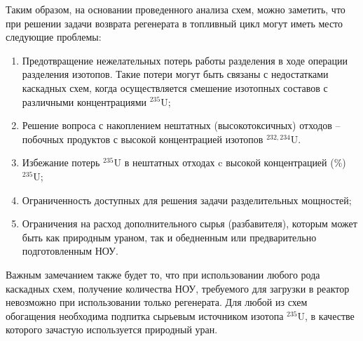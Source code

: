 Таким образом, на основании проведенного анализа схем, можно заметить, что при решении задачи возврата регенерата в топливный цикл могут иметь место следующие проблемы:
\begin{enumerate}
  \item Предотвращение нежелательных потерь работы разделения в ходе операции разделения изотопов. Такие потери могут быть связаны с недостатками каскадных схем, когда осуществляется смешение изотопных составов с различными концентрациями $^{235}$U; 
  \item Решение вопроса с накоплением нештатных (высокотоксичных) отходов -- побочных продуктов с высокой концентрацией изотопов $^{232,234}$U.
  \item Избежание потерь $^{235}$U  в нештатных отходах c высокой концентрацией (\%) $^{235}$U;
  \item Ограниченность доступных для решения задачи разделительных мощностей;
  \item Ограничения на расход дополнительного сырья (разбавителя), которым может быть как природным ураном, так и обедненным или предварительно подготовленным НОУ.
\end{enumerate}

Важным замечанием также будет то, что при использовании любого рода каскадных схем, получение количества НОУ, требуемого для загрузки в реактор невозможно при использовании только регенерата. Для любой из схем обогащения необходима подпитка сырьевым источником изотопа $^{235}$U, в качестве которого зачастую используется природный уран.